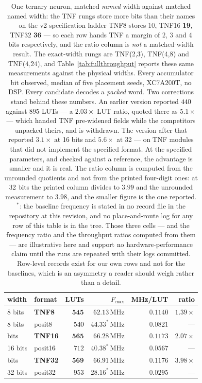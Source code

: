 \begin{table}[t]\centering
\caption{One ternary neuron, matched \emph{named} width against matched named
width: the TNF rungs store more bits than their names --- on the v2
specification ladder TNF8 stores 10, TNF16 \textbf{19}, TNF32 \textbf{36} ---
so each row hands TNF a margin of 2, 3 and 4 bits respectively, and the ratio
column is \emph{not} a matched-width result. The exact-width rungs are
TNF(2,3), TNF(4,8) and TNF(4,24), and Table~\ref{tab:fullthroughput} reports
these same measurements against the physical widths. Every
accumulator bit observed, median of five placement seeds, XC7A200T, no DSP.
Every candidate decodes a \emph{packed} word. Two corrections stand behind these
numbers. An earlier version reported $440$ against $895$ LUTs --- a $2.03\times$
LUT ratio, quoted there as $5.1\times$ --- which handed TNF pre-widened fields while the competitors unpacked
theirs, and is withdrawn. The version after that reported $3.1\times$ at 16 bits
and $5.6\times$ at 32 --- on TNF modules that did not implement the specified
format. At the specified parameters, and checked against a reference, the
advantage is smaller and it is real. The ratio column is computed from the
unrounded quotients and not from the printed four-digit ones: at 32 bits the
printed column divides to $3.99$ and the unrounded measurement to $3.98$, and the
smaller figure is the one reported. $^{\ast}$: the baseline frequency is stated in
no record file in the repository at this revision, and no place-and-route log for
any row of this table is in the tree. Those three cells --- and the frequency ratio
and the throughput ratios computed from them --- are illustrative here and support
no hardware-performance claim until the runs are repeated with their logs
committed. Row-level records exist for our own rows and not for the baselines,
which is an asymmetry a reader should weigh rather than a detail.}
\label{tab:tnet}
\begin{tabular}{llrrrr}
\toprule
width & format & LUTs & $F_{\max}$ & MHz/LUT & ratio \\
\midrule
8 bits & \textbf{TNF8} & $\mathbf{545}$ & $62.13$\,MHz & $\mathbf{0.1140}$ & $\mathbf{1.39\times}$ \\
8 bits & posit8 & $540$ & $44.33^{\ast}$\,MHz & $0.0821$ & --- \\
\addlinespace
16 bits & \textbf{TNF16} & $\mathbf{565}$ & $66.28$\,MHz & $\mathbf{0.1173}$ & $\mathbf{2.07\times}$ \\
16 bits & posit16 & $712$ & $40.38^{\ast}$\,MHz & $0.0567$ & --- \\
\addlinespace
32 bits & \textbf{TNF32} & $\mathbf{569}$ & $66.91$\,MHz & $\mathbf{0.1176}$ & $\mathbf{3.98\times}$ \\
32 bits & posit32 & $953$ & $28.16^{\ast}$\,MHz & $0.0295$ & --- \\
\bottomrule
\end{tabular}
\end{table}

